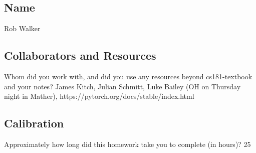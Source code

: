 \documentclass[submit]{harvardml}
\begin{document}
\newpage
\subsection*{Name}
Rob Walker

\subsection*{Collaborators and Resources}
Whom did you work with, and did you use any resources beyond cs181-textbook and your notes?
James Kitch, Julian Schmitt, Luke Bailey (OH on Thursday night in Mather), https://pytorch.org/docs/stable/index.html

\subsection*{Calibration}
Approximately how long did this homework take you to complete (in hours)? 25
\end{document}
